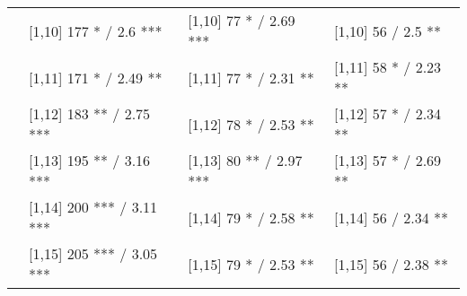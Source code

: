 \begin{table}
\begin{tabular}[t]{llll}
 & {}[1,10] 177 * / 2.6 *** & {}[1,10] 77 * / 2.69 *** & {}[1,10] 56  / 2.5 **\\
 & {}[1,11] 171 * / 2.49 ** & {}[1,11] 77 * / 2.31 ** & {}[1,11] 58 * / 2.23 **\\
 & {}[1,12] 183 ** / 2.75 *** & {}[1,12] 78 * / 2.53 ** & {}[1,12] 57 * / 2.34 **\\
\addlinespace
 & {}[1,13] 195 ** / 3.16 *** & {}[1,13] 80 ** / 2.97 *** & {}[1,13] 57 * / 2.69 **\\
 & {}[1,14] 200 *** / 3.11 *** & {}[1,14] 79 * / 2.58 ** & {}[1,14] 56  / 2.34 **\\
 & {}[1,15] 205 *** / 3.05 *** & {}[1,15] 79 * / 2.53 ** & {}[1,15] 56  / 2.38 **\\
\bottomrule
\end{tabular}
\end{table}
